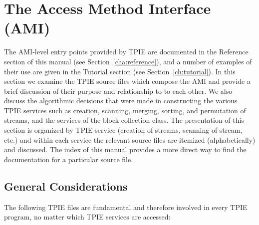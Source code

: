 


\section{The Access Method Interface (AMI)}

The AMI-level entry points provided by
TPIE are documented in the Reference section of this manual (see
Section~\ref{cha:reference}), and a number of examples of their use
are given in the Tutorial section (see Section~\ref{ch:tutorial}).  In
this section we examine the TPIE source files which compose the AMI
and provide a brief discussion of their purpose and relationship to to
each other. We also discuss the algorithmic decisions that were made
in constructing the various TPIE services such as creation, scanning,
merging, sorting, and permutation of streams, and the services of the
block collection class. The presentation of this section is organized
by TPIE service (creation of streams, scanning of stream, etc.) and
within each service the relevant source files are itemized
(alphabetically) and discussed. The index of this manual provides a
more direct way to find the documentation for a particular source
file.

\subsection{General Considerations}

The following TPIE files are fundamental and therefore involved in
every TPIE program, no matter which TPIE services are
accessed:

